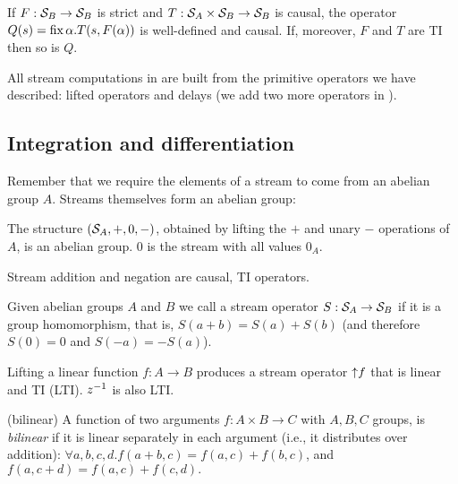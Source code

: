 \begin{lemma}\label{feedback-semantics}
\label{cor-loop}
If $F: \mathcal{S}_{B} \to \mathcal{S}_{B}$ is strict and $T: \mathcal{S}_{A} \times \mathcal{S}_{B} \to \mathcal{S}_{B}$ is causal,
the operator $Q(s)=\mbox{fix}\,\alpha.T(s,F(\alpha))$ is well-defined and causal.
If, moreover, $F$ and $T$ are TI then so is $Q$.
\end{lemma}

All stream computations in \dbsp are built from the primitive operators
we have described: lifted operators and delays (we add two more operators in ).


\subsection{Integration and differentiation}\label{sec:abelianstreams}

Remember that we require the elements of a stream to come from an abelian group $A$.
Streams themselves form an abelian group:

\begin{proposition}
The structure $(\mathcal{S}_{A},+,0,-)$, obtained by lifting the $+$ and unary $-$ operations of $A$,
is an abelian group.  0 is the stream with all values $0_A$.
\end{proposition}

\noindent
Stream addition and negation are causal, TI operators.

\begin{definition}
Given abelian groups $A$ and $B$ we call a stream operator
$S: \mathcal{S}_{A} \rightarrow \mathcal{S}_{B}$  if it is a group homomorphism, that is,
$S(a+b)=S(a)+S(b)$ (and therefore $S(0)=0$ and $S(-a)=-S(a)$).
\end{definition}

Lifting a linear function $f: A \to B$ produces
a stream operator ${\uparrow}f$ that is linear and TI (LTI).
$z^{-1}$ is also LTI.

\begin{definition}(bilinear)
A function of two arguments $f: A \times B \to C$ with $A, B, C$ groups, is \emph{bilinear}
if it is linear separately in each argument (i.e., it distributes over addition):
$\forall a, b, c, d . f(a+b, c) = f(a, c) + f(b, c)$, and $f(a, c+d) = f(a, c) + f(c, d).$
\end{definition}

